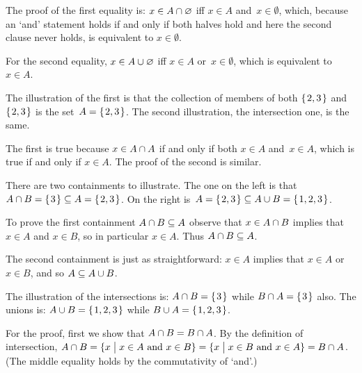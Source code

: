 \documentclass{ibl}  %
\begin{document}
\begin{ex}
\begin{ans}
\begin{items}
  The proof of the first equality is: $x\in A\cap\varnothing$
  iff $x\in A$ and~$x\in\emptyset$, 
  which, because an `and' statement holds if and only if both halves hold
  and here the second clause never holds,
  is equivalent to $x\in\emptyset$. 

  For the second equality, 
  $x\in A\cup\varnothing$ iff $x\in A$ or~$x\in\emptyset$,
  which is equivalent to $x\in A$.
\item The illustration of the first is that the collection of members of both
  $\mbox{$\{\hspace{0.1em}2,3\hspace{0.1em}\}$}$ and~$\mbox{$\{\hspace{0.1em}2,3\hspace{0.1em}\}$}$ is the set~$A=\mbox{$\{\hspace{0.1em}2,3\hspace{0.1em}\}$}$.
  The second illustration, the intersection one, is the same.

  The first is true because
  $x\in A\cap A$ if and only if
  both $x\in A$ and~$x\in A$, 
  which is true if and only if $x\in A$.
  The proof of the second is similar.
\item There are two containments to illustrate.
  The one on the left is that $A\cap B=\mbox{$\{\hspace{0.1em}3\hspace{0.1em}\}$}\subseteq A=\mbox{$\{\hspace{0.1em}2,3\hspace{0.1em}\}$}$.
  On the right is~$A=\mbox{$\{\hspace{0.1em}2,3\hspace{0.1em}\}$}\subseteq A\cup B=\mbox{$\{\hspace{0.1em}1,2,3\hspace{0.1em}\}$}$.

  To prove the first containment $A\cap B\subseteq A$ observe that 
  $x\in A\cap B$ implies that
  $x\in A$ and $x\in B$, so in particular $x\in A$.
  Thus $A\cap B\subseteq A$.

  The second containment is just as straightforward:
  $x\in A$ implies that $x\in A$ or~$x\in B$, and so $A\subseteq A\cup B$.
\item The illustration of the intersections is: $A\cap B=\mbox{$\{\hspace{0.1em}3\hspace{0.1em}\}$}$
  while $B\cap A=\mbox{$\{\hspace{0.1em}3\hspace{0.1em}\}$}$ also.
  The unions is: $A\cup B=\mbox{$\{\hspace{0.1em}1,2,3\hspace{0.1em}\}$}$ while $B\cup A=\mbox{$\{\hspace{0.1em}1,2,3\hspace{0.1em}\}$}$.

  For the proof, first we show that
  $A\cap B=B\cap A$.
  By the definition of intersection,  
  $A\cap B=\{x \bigm| \text{$x\in A$ and $x\in B$}\}
    =\{x \bigm| \text{$x\in B$ and $x\in A$}\}=B\cap A$.
  (The middle equality holds by the commutativity of `and'.)


\end{items}
\end{ans}
\end{ex}
\end{document}
